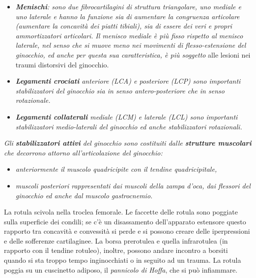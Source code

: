 \begin{itemize}
\item
  \emph{\textbf{Menischi}: sono due fibrocartilagini di struttura triangolare, uno mediale e uno laterale e hanno la funzione sia di aumentare la congruenza articolare (aumentare la concavità dei piatti tibiali), sia di essere dei veri e propri ammortizzatori articolari. }
\emph{Il menisco mediale è più fisso rispetto al menisco laterale, nel senso che si muove meno nei movimenti di flesso-estensione del ginocchio, ed anche per questa sua caratteristica, è più soggetto} alle
lesioni nei traumi distorsivi del ginocchio.
\item
  \emph{\textbf{Legamenti crociati} anteriore (LCA) e posteriore (LCP) sono importanti stabilizzatori del ginocchio sia in senso antero-posteriore che in senso rotazionale.}
\item
  \emph{\textbf{Legamenti collaterali} mediale (LCM) e laterale (LCL) sono importanti stabilizzatori medio-laterali del ginocchio ed anche stabilizzatori rotazionali.}
\end{itemize}

\emph{Gli \textbf{stabilizzatori attivi} del ginocchio sono costituiti dalle \textbf{strutture muscolari} che decorrono attorno all'articolazione del ginocchio:}

\begin{itemize}
\item
  \emph{anteriormente il muscolo quadricipite con il tendine quadricipitale,}
\item
  \emph{muscoli posteriori rappresentati dai muscoli della zampa d'oca, dai flessori del ginocchio ed anche dal muscolo gastrocnemio.}
\end{itemize}

La rotula scivola nella troclea femorale. Le faccette delle rotula sono poggiate sulla superficie dei condili; se c'è un disassamento dell'apparato estensore questo rapporto tra concavità e convessità si perde e si possono creare delle iperpressioni e delle sofferenze cartilaginee. La borsa prerotulea e quella infrarotulea (in rapporto con il tendine rotuleo), inoltre, possono andare incontro a borsiti quando si sta troppo tempo inginocchiati o in seguito ad un trauma. La rotula poggia su un cuscinetto adiposo, il \emph{pannicolo di Hoffa}, che si può infiammare.


